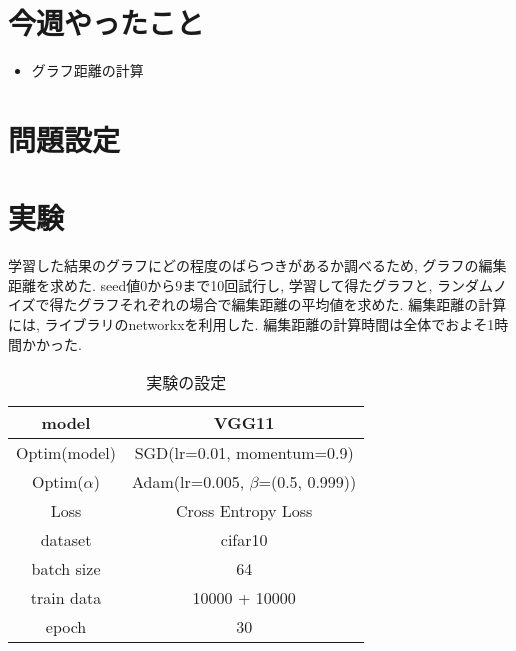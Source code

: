 \documentclass[twocolumn]{jarticle}     %
\begin{document}


\section{今週やったこと}
\begin{itemize}
	\item グラフ距離の計算
\end{itemize}

\section{問題設定}

\section{実験}
学習した結果のグラフにどの程度のばらつきがあるか調べるため, グラフの編集距離を求めた.
seed値0から9まで10回試行し, 学習して得たグラフと, ランダムノイズで得たグラフそれぞれの場合で編集距離の平均値を求めた.
編集距離の計算には, ライブラリのnetworkxを利用した. 編集距離の計算時間は全体でおよそ1時間かかった.

\begin{table}[tb]
  \begin{center}
    \caption{実験の設定}
    \begin{tabular}{|c|c|} \hline
      model & VGG11 \\ \hline
      Optim(model) & SGD(lr=0.01, momentum=0.9) \\ \hline
      Optim($\alpha$) & Adam(lr=0.005, $\beta$=(0.5, 0.999)) \\ \hline
      Loss & Cross Entropy Loss \\ \hline
      dataset & cifar10 \\ \hline
      batch size & 64 \\ \hline
      train data & 10000 + 10000 \\ \hline
      epoch & 30 \\ \hline
    \end{tabular}
    \label{tab:setting}
  \end{center}
\end{table}
\end{document}
